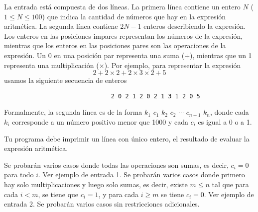 \documentclass{oci}
\begin{document}
\begin{problemDescription}

\end{problemDescription}

\newpage
\begin{inputDescription}
  La entrada está compuesta de dos líneas.
  La primera línea contiene un entero $N$ ($1\leq N\leq 100$) que indica la
  cantidad de números que hay en la expresión aritmética.
  La segunda línea contiene $2N-1$ enteros describiendo la expresión.
  Los enteros en las posiciones impares representan los números de la expresión,
  mientras que los enteros en las posiciones pares son las operaciones de la
  expresión.
  Un 0 en una posición par representa una suma ($+$), mientras que un 1
  representa una multiplicación ($\times$). 
  Por ejemplo, para representar la expresión
  $$
  2 + 2 \times 2 + 2\times 3 \times 2 + 5
  $$
  usamos la siguiente secuencia de enteros
\begin{verbatim}
                              2 0 2 1 2 0 2 1 3 1 2 0 5
\end{verbatim}

  Formalmente, la segunda línea es de la forma $k_1$ $c_1$ $k_2$ $c_2$ $\cdots$
  $c_{n-1}$ $k_n$, donde cada $k_i$ corresponde a un número positivo menor que
  1000 y cada $c_i$ es igual a 0 o a 1.
\end{inputDescription}

\begin{outputDescription}
Tu programa debe imprimir un línea con único entero, el resultado de evaluar la
expresión aritmética.
\end{outputDescription}

\begin{scoreDescription}
   Se probarán varios casos donde todas las operaciones son sumas, es decir,
  $c_i = 0$ para todo $i$.
  Ver ejemplo de entrada 1.
   Se probarán varios casos donde primero hay solo multiplicaciones y luego
  solo sumas, es decir, existe $m \leq n$ tal que para
  cada $i < m$, se tiene que $c_i = 1$, y para cada $i \geq m$ se tiene $c_i =
  0$. Ver ejemplo de entrada 2. 
   Se probarán varios casos sin restricciones adicionales.
\end{scoreDescription}

\begin{sampleDescription}
\end{sampleDescription}
\end{document}
